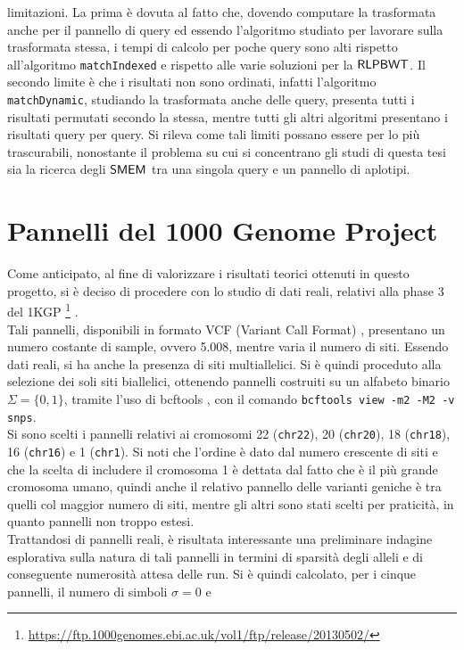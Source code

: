 limitazioni. La prima è dovuta al fatto che, dovendo computare
la trasformata anche per il pannello di query ed essendo l'algoritmo studiato
per lavorare sulla trasformata stessa, i tempi di calcolo per poche query sono
alti rispetto all'algoritmo \texttt{matchIndexed} e rispetto alle varie
soluzioni per la $\mbox{\rm {\sf RLPBWT}}$. Il secondo limite è che i risultati non sono
ordinati, infatti l'algoritmo \texttt{matchDynamic}, studiando la trasformata
anche delle query,
presenta tutti i risultati permutati secondo la stessa, mentre tutti gli altri
algoritmi presentano i risultati query per query. Si rileva
come tali limiti possano essere per lo più trascurabili, nonostante il problema
su
cui si concentrano gli studi di questa tesi sia la ricerca degli $\mbox{\rm {\sf SMEM}}$ tra
una 
singola query e un pannello di aplotipi.
\section{Pannelli del 1000 Genome Project}
Come anticipato, al fine di valorizzare i risultati teorici ottenuti in
questo progetto, si 
è deciso di procedere con lo studio di dati reali, relativi alla phase
  3 del 1KGP
\footnote{\url{https://ftp.1000genomes.ebi.ac.uk/vol1/ftp/release/20130502/}}
\cite{1kgp}.\\ 
Tali pannelli, disponibili in formato VCF (Variant Call Format) \cite{vcf},
presentano un numero 
costante di sample, ovvero 5.008, mentre varia il numero di siti. Essendo
dati reali, si ha anche la presenza di siti multiallelici. Si è quindi proceduto
alla selezione dei soli siti biallelici, ottenendo pannelli costruiti su
un alfabeto binario $\Sigma=\{0,1\}$, tramite l'uso di bcftools
\cite{bcftools}, con il comando \texttt{bcftools view -m2 -M2
  -v snps}.\\
Si sono scelti i pannelli relativi ai cromosomi 22 (\texttt{chr22}), 20
(\texttt{chr20}), 18 (\texttt{chr18}), 16 (\texttt{chr16}) e 1 (\texttt{chr1}).
Si noti che  
l'ordine è dato dal numero crescente di siti e che la scelta di includere il
cromosoma 1 è dettata dal fatto che è il più grande cromosoma
umano, quindi  anche il relativo pannello delle varianti geniche
è tra quelli col maggior numero di siti, mentre gli altri sono stati scelti
per praticità, in quanto pannelli non troppo estesi.\\
Trattandosi di pannelli reali, è risultata interessante una preliminare
indagine esplorativa sulla natura di tali pannelli in termini di
sparsità degli alleli e di conseguente numerosità attesa delle run. Si è
quindi calcolato, per i cinque pannelli, il numero di simboli $\sigma=0$ e

